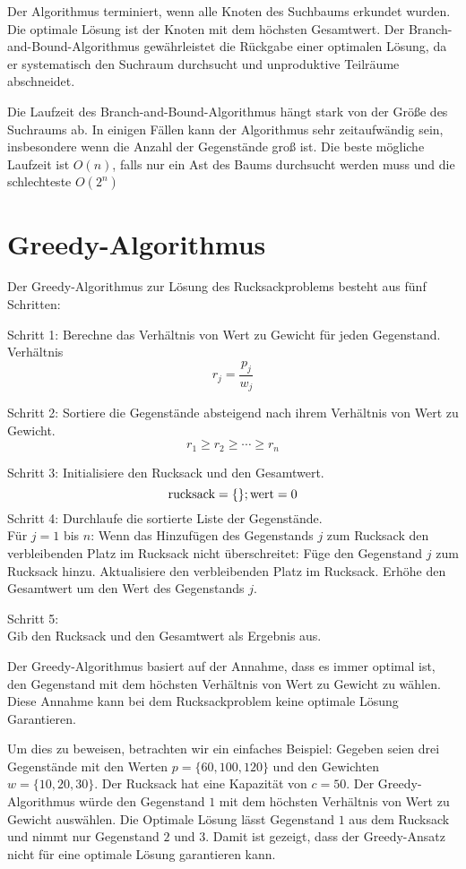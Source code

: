 Der Algorithmus terminiert, wenn alle Knoten des Suchbaums 
erkundet wurden. Die optimale Lösung ist der Knoten mit dem 
höchsten Gesamtwert. Der Branch-and-Bound-Algorithmus 
gewährleistet die Rückgabe einer optimalen Lösung, da er 
systematisch den Suchraum durchsucht und unproduktive 
Teilräume abschneidet.

Die Laufzeit des 
Branch-and-Bound-Algorithmus hängt stark von der Größe des 
Suchraums ab. In einigen Fällen kann der Algorithmus 
sehr zeitaufwändig sein, insbesondere wenn die Anzahl der 
Gegenstände groß ist. Die beste mögliche Laufzeit ist 
$O(n)$, falls nur ein Ast des Baums durchsucht werden muss und 
die schlechteste $O(2^n)$\ \cite[vgl.]{Martello1987}

\section{Greedy-Algorithmus}
Der Greedy-Algorithmus zur Lösung des Rucksackproblems besteht 
aus fünf Schritten:

Schritt 1: Berechne das Verhältnis von Wert zu Gewicht für 
jeden Gegenstand.
Verhältnis \[r_j = \frac{p_j}{w_j}\]

Schritt 2: Sortiere die Gegenstände absteigend nach ihrem 
Verhältnis von Wert zu Gewicht.
\[r_1 \geq r_2 \geq \cdots \geq r_n\]

Schritt 3: Initialisiere den Rucksack und den Gesamtwert.
\[   \text{rucksack} = \{\}; \\
    \text{wert} = 0 \]
Schritt 4: Durchlaufe die sortierte Liste der Gegenstände.\\
Für $j = 1$ bis $n$: 
Wenn das Hinzufügen des Gegenstands $j$ zum Rucksack den 
verbleibenden Platz im Rucksack nicht überschreitet:
Füge den Gegenstand $j$ zum Rucksack hinzu.
Aktualisiere den verbleibenden Platz im Rucksack.
Erhöhe den Gesamtwert um den Wert des Gegenstands $j$.

Schritt 5: \\Gib den Rucksack und den Gesamtwert als Ergebnis 
aus.

Der Greedy-Algorithmus basiert auf der Annahme, dass es 
immer optimal ist, den Gegenstand mit dem höchsten Verhältnis 
von Wert zu Gewicht zu wählen. Diese Annahme kann bei dem Rucksackproblem
keine optimale Lösung Garantieren.

Um dies zu beweisen, betrachten wir ein einfaches Beispiel: 
Gegeben seien drei Gegenstände mit den Werten $p = \{60, 100, 120\}$ 
und den Gewichten $w =\{10, 20, 30\}$. Der Rucksack hat eine Kapazität 
von $c = 50$. Der Greedy-Algorithmus würde den Gegenstand $1$ mit 
dem höchsten Verhältnis von Wert zu Gewicht auswählen. Die Optimale 
Lösung lässt Gegenstand $1$ aus dem Rucksack und nimmt nur Gegenstand $2$ und $3$.
Damit ist gezeigt, dass der Greedy-Ansatz nicht für eine optimale Lösung 
garantieren kann.

